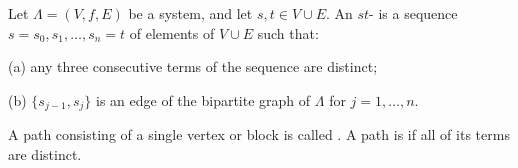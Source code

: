 Let $\Lambda = (V, f, E)$ be a system, and let $s, t \in V \cup E$. An $st$- is a sequence $s = s_0, s_1, \ldots, s_n = t$ of elements of $V \cup E$ such that:

(a) any three consecutive terms of the sequence are distinct;

(b) $\{s_{j-1}, s_j\}$ is an edge of the bipartite graph of $\Lambda$ for $j = 1, \ldots, n$.

A path consisting of a single vertex or block is called . A path is  if all of its terms are distinct.
